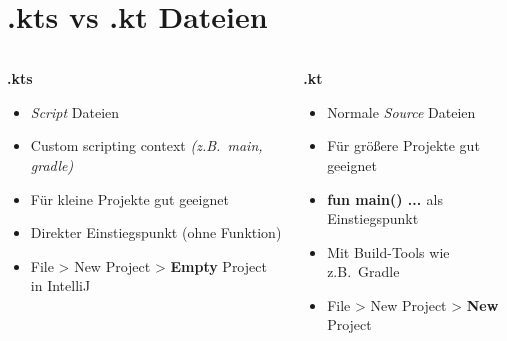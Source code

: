     \section{\textbf{.kts} vs \textbf{.kt} Dateien}\label{sec:kts-kt-dateien}
    \begin{frame}
        \slidehead
        \begin{columns}
            \begin{column}{0.5\textwidth}
                \begin{center}
                    \large
                    \textbf{.kts}
                \end{center}
                \begin{itemize}
                    \item<2-> \textit{Script} Dateien
                    \item<3-> Custom scripting context \textit{(z.B.~main, gradle)}
                    \item<4-> Für kleine Projekte gut geeignet
                    \item<5-> Direkter Einstiegspunkt (ohne Funktion)
                    \item<10-> File > New Project > \textbf{Empty} Project in IntelliJ
                \end{itemize}
            \end{column}
            \begin{column}{0.5\textwidth}
                \begin{center}
                    \large
                    \textbf{.kt}
                \end{center}
                \begin{itemize}
                    \item<6-> Normale \textit{Source} Dateien
                    \item<7-> Für größere Projekte gut geeignet
                    \item<8-> \textbf{fun main() { ... }} als Einstiegspunkt
                    \item<9-> Mit Build-Tools wie z.B.~Gradle
                    \item<10-> File > New Project > \textbf{New} Project
                \end{itemize}
            \end{column}
        \end{columns}
    \end{frame}

